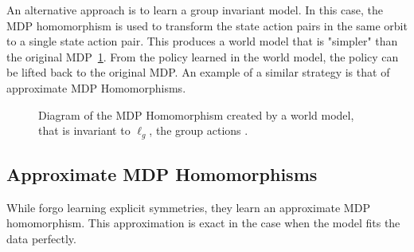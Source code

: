 An alternative approach is to learn a group invariant model. In this case, the MDP homomorphism is used to transform the state action pairs in the same orbit to a single state action pair. This produces a world model that is "simpler" than the original MDP~\ref{fig:invariant_world_model}. From the policy learned in the world model, the policy can be lifted back to the original MDP. An example of a similar strategy is that of approximate MDP Homomorphisms.
\begin{figure}[h]
	\centering
	\caption{Diagram of the MDP Homomorphism created by a world model, that is invariant to $\ell_g$,  the group actions .}
	\label{fig:invariant_world_model}
\end{figure}
\subsection{Approximate MDP Homomorphisms}
While \cite{van2020plannable} forgo learning explicit symmetries, they learn an approximate MDP homomorphism. This approximation is exact in the case when the model fits the data perfectly.

